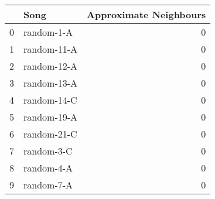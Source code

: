 \begin{tabular}{llr}
\toprule
 & Song & Approximate Neighbours \\
\midrule
0 & random-1-A & 0 \\
1 & random-11-A & 0 \\
2 & random-12-A & 0 \\
3 & random-13-A & 0 \\
4 & random-14-C & 0 \\
5 & random-19-A & 0 \\
6 & random-21-C & 0 \\
7 & random-3-C & 0 \\
8 & random-4-A & 0 \\
9 & random-7-A & 0 \\
\bottomrule
\end{tabular}
